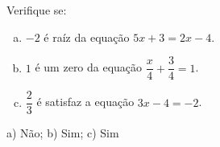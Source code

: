 \newpage 
\begin{secExercicios}


\begin{exer}
Verifique se:
\begin{enumerate}[a)]
\item $-2$ é raíz da equação $5x + 3= 2x - 4$.
\item $1$ é um zero da equação $\dfrac{x}{4} + \dfrac{3}{4}= 1$.
\item $\dfrac{2}{3}$ é satisfaz a equação $3x - 4= -2$.
\end{enumerate}
\end{exer}
\begin{resp}
a) Não; b) Sim; c) Sim
\end{resp}


\end{secExercicios}
